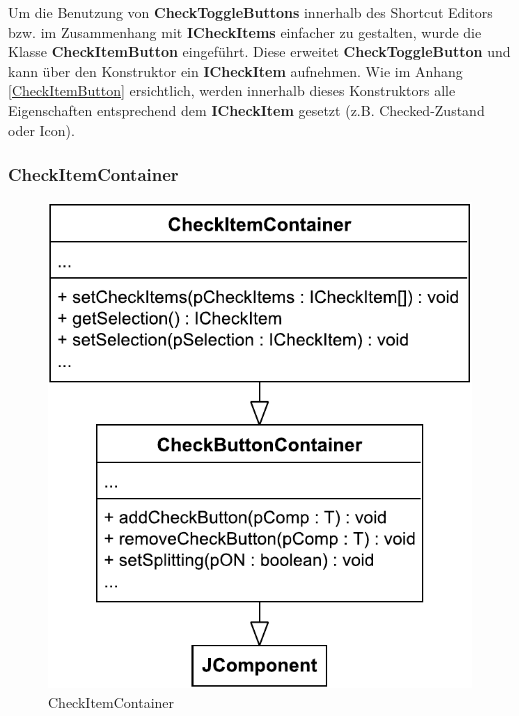 \vspace{-9px}

Um die Benutzung von \textbf{CheckToggleButtons} innerhalb des Shortcut Editors bzw. im Zusammenhang mit \textbf{ICheckItems} einfacher zu gestalten, wurde die Klasse \textbf{CheckItemButton} eingeführt. Diese erweitet \textbf{CheckToggleButton} und kann über den Konstruktor ein \textbf{ICheckItem} aufnehmen. Wie im Anhang \ref{CheckItemButton} ersichtlich, werden innerhalb dieses Konstruktors alle Eigenschaften entsprechend dem \textbf{ICheckItem} gesetzt (z.B. Checked-Zustand oder Icon).

\vspace{-9px}

\subsubsection{CheckItemContainer}

\vspace{-3px}

\begin{figure}
	\vspace{-12px}
	\centering
	\includegraphics[width=.95\linewidth]{../graphic/diagrams/CD_CheckItemContainer/CD_CheckItemContainer}
	\caption{CheckItemContainer}
	\label{fig:cdcheckitemcontainer}
\end{figure}

